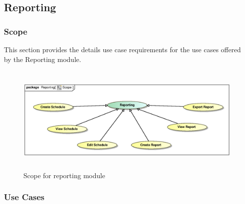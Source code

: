 \subsection{Reporting}

\subsubsection{Scope}
\par{This section provides the details use case requirements for the use cases offered by the Reporting module.}

\begin{figure}[h]
\includegraphics[height=200px, width=500px]{epsImages/Reporting/ReportScope.eps}
\caption{Scope for reporting module}
\end{figure}

\subsubsection{Use Cases}

